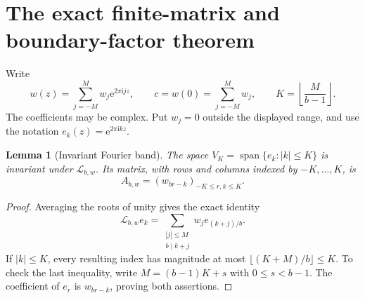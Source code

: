 \documentclass[11pt,a4paper]{article}
\newtheorem{lemma}[theorem]{Lemma}
\theoremstyle{definition}
\theoremstyle{remark}
\newcommand{\ii}{\mathrm i}
\newcommand{\e}{\mathrm e}
\newcommand{\Lop}{\mathcal L}
\newcommand{\Span}{\operatorname{span}}
\numberwithin{equation}{section}
\begin{document}
\section{The exact finite-matrix and boundary-factor theorem}
\label{sec:general}

Write
\begin{equation}
 w(z)=\sum_{j=-M}^{M}w_j\e^{2\pi\ii jz},\qquad
 c=w(0)=\sum_{j=-M}^{M}w_j,
 \qquad K=\left\lfloor\frac{M}{b-1}\right\rfloor.
 \label{eq:weightdata}
\end{equation}
The coefficients may be complex. Put $w_j=0$ outside the displayed range,
and use the notation $e_k(z)=\e^{2\pi\ii kz}$.

\begin{lemma}[Invariant Fourier band]
\label{lem:band}
The space $V_K=\Span\{e_k:|k|\le K\}$ is invariant under $\Lop_{b,w}$.
Its matrix, with rows and columns indexed by $-K,\ldots,K$, is
\begin{equation}
 A_{b,w}=(w_{br-k})_{-K\le r,k\le K}.
 \label{eq:matrix}
\end{equation}
\end{lemma}
\begin{proof}
Averaging the roots of unity gives the exact identity
\begin{equation}
 \Lop_{b,w}e_k=
 \sum_{\substack{|j|\le M\\b\mid k+j}}w_j e_{(k+j)/b}.
 \label{eq:mode-general}
\end{equation}
If $|k|\le K$, every resulting index has magnitude at most
$\lfloor(K+M)/b\rfloor\le K$. To check the last inequality, write
$M=(b-1)K+s$ with $0\le s<b-1$.
The coefficient of $e_r$ is $w_{br-k}$, proving both assertions.
\end{proof}
\end{document}
